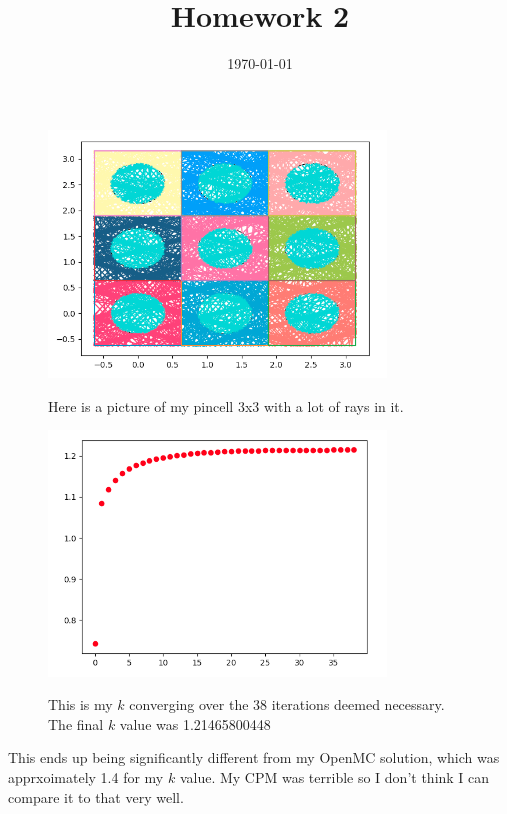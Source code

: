 \documentclass[a4paper]{article}
\title{Homework 2}
\date{\today}
\begin{document}
\maketitle



\begin{figure}[H]
\centering
\includegraphics[width=0.8\textwidth]{raysPic}
  \caption{\label{fig:fig1}} Here is a picture of my pincell 3x3 with a lot of rays in it.
\end{figure}


\begin{figure}[H]
\centering
\includegraphics[width=0.8\textwidth]{keff_convergence}
  \caption{\label{fig:fig1}} This is my $k$ converging over the 38 iterations deemed necessary. The final $k$ value was 1.21465800448
\end{figure}


This ends up being significantly different from my OpenMC solution, which was apprxoimately 1.4 for my $k$ value. My CPM was terrible so I don't think I can compare it to that very well. \par~\par
\end{document}

